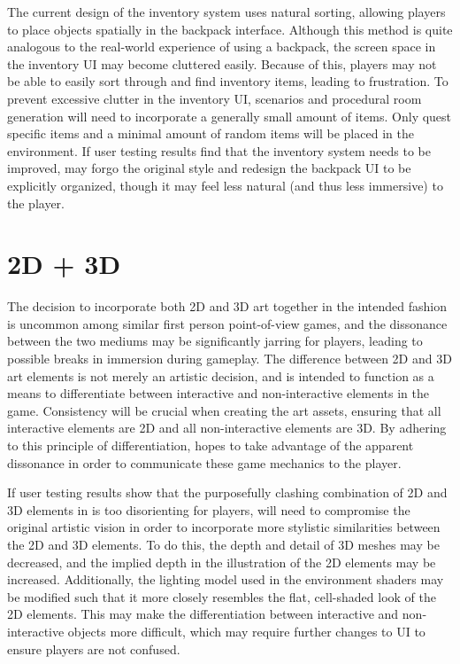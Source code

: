 \documentclass{GlobalDocument}
\begin{document}
The current design of the inventory system uses natural sorting, allowing players to place objects spatially in the backpack interface. Although this method is quite analogous to the real-world experience of using a backpack, the screen space in the inventory UI may become cluttered easily. Because of this, players may not be able to easily sort through and find inventory items, leading to frustration. To prevent excessive clutter in the inventory UI, scenarios and procedural room generation will need to incorporate a generally small amount of items. Only quest specific items and a minimal amount of random items will be placed in the environment. If user testing results find that the inventory system needs to be improved, \ourteam{} may forgo the original style and redesign the backpack UI to be explicitly organized, though it may feel less natural (and thus less immersive) to the player.

\section{2D + 3D}
The decision to incorporate both 2D and 3D art together in the intended fashion is uncommon among similar first person point-of-view games, and the dissonance between the two mediums may be significantly jarring for players, leading to possible breaks in immersion during gameplay. The difference between 2D and 3D art elements is not merely an artistic decision, and is intended to function as a means to differentiate between interactive and non-interactive elements in the game. Consistency will be crucial when creating the art assets, ensuring that all interactive elements are 2D and all non-interactive elements are 3D. By adhering to this principle of differentiation, \ourteam{} hopes to take advantage of the apparent dissonance in order to communicate these game mechanics to the player.

If user testing results show that the purposefully clashing combination of 2D and 3D elements in \ourgame{} is too disorienting for players, \ourteam{} will need to compromise the original artistic vision in order to incorporate more stylistic similarities between the 2D and 3D elements. To do this, the depth and detail of 3D meshes may be decreased, and the implied depth in the illustration of the 2D elements may be increased. Additionally, the lighting model used in the environment shaders may be modified such that it more closely resembles the flat, cell-shaded look of the 2D elements. This may make the differentiation between interactive and non-interactive objects more difficult, which may require further changes to UI to ensure players are not confused.
\end{document}
